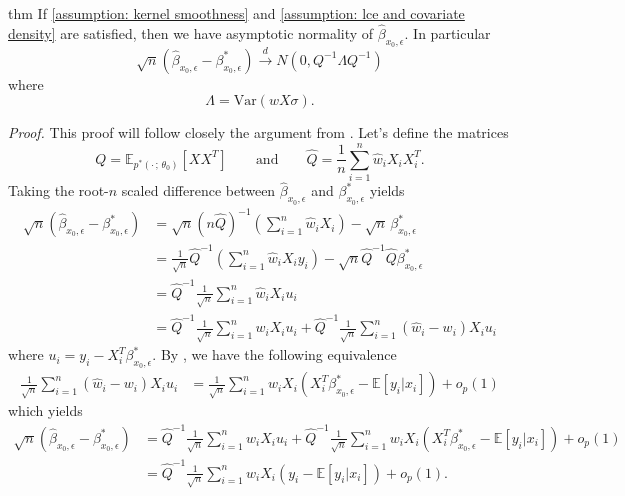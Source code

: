 \documentclass[11pt]{article}
\begin{document}
\begin{restatable}{thm}{} \label{thm: central limit for beta}
    If \cref{assumption: kernel smoothness} and \cref{assumption: lce and covariate density} are satisfied, then we have asymptotic normality of $\hat{\beta}_{x_0,\epsilon}$. In particular
    \[\sqrt{n}(\hat{\beta}_{x_0, \epsilon} - \beta^*_{x_0, \epsilon}) \overset{d}{\rightarrow} N(0, Q^{-1}\Lambda Q^{-1})\]
    where 
    \[\Lambda = \text{Var}(wX\sigma).\]
\end{restatable}
\noindent \textit{Proof.} This proof will follow closely the argument from \citet{Newey_Ruud_2005}. Let's define the matrices
\begin{equation}
    Q = \mathbb{E}_{p^*(\cdot\,;\, \theta_0)}\left[XX^T\right] \qquad \text{and} \qquad \hat{Q} = \frac{1}{n}\sum_{i = 1}^n\hat{w}_iX_iX_i^T.
\end{equation}
Taking the root-$n$ scaled difference between $\hat{\beta}_{x_0, \epsilon}$ and $\beta^*_{x_0, \epsilon}$ yields
\begin{align}
    \sqrt{n}(\hat{\beta}_{x_0, \epsilon} -\beta^*_{x_0, \epsilon}) &= \sqrt{n}\left(n\hat{Q}\right)^{-1}\left(\sum_{i = 1}^n\hat{w}_iX_i\right) - \sqrt{n}\,\beta_{x_0, \epsilon}^*\\
    &= \frac{1}{\sqrt{n}}\hat{Q}^{-1}\left(\sum_{i = 1}^n\hat{w}_iX_iy_i\right) - \sqrt{n}\hat{Q}^{-1}\hat{Q}\beta_{x_0, \epsilon}^* \\
    &= \hat{Q}^{-1}\frac{1}{\sqrt{n}}\sum_{i=1}^n \hat{w}_iX_iu_i\\
    &= \hat{Q}^{-1}\frac{1}{\sqrt{n}}\sum_{i = 1}^nw_iX_iu_i + \hat{Q}^{-1}\frac{1}{\sqrt{n}}\sum_{i = 1}^n(\hat{w}_i - w_i)X_iu_i\label{eq: asymptotic expansion}
\end{align}
where $u_i = y_i - X_i^T\beta^*_{x_0, \epsilon}$. By , we have the following equivalence
\begin{align}
    \frac{1}{\sqrt{n}}\sum_{i = 1}^n(\hat{w}_i - w_i)X_iu_i &= \frac{1}{\sqrt{n}}\sum_{i = 1}^nw_iX_i\left(X_i^T\beta^*_{x_0, \epsilon} - \mathbb{E}[y_i|x_i]\right) + o_p(1)
\end{align}
which yields
\begin{align}
    \sqrt{n}(\hat{\beta}_{x_0, \epsilon} -\beta^*_{x_0, \epsilon}) &= \hat{Q}^{-1}\frac{1}{\sqrt{n}}\sum_{i = 1}^nw_iX_iu_i + \hat{Q}^{-1}\frac{1}{\sqrt{n}}\sum_{i = 1}^nw_iX_i\left(X_i^T\beta^*_{x_0, \epsilon} - \mathbb{E}[y_i|x_i]\right) + o_p(1) \\
    &= \hat{Q}^{-1}\frac{1}{\sqrt{n}}\sum_{i = 1}^nw_iX_i\left(y_i - \mathbb{E}[y_i|x_i]\right) + o_p(1).
\end{align}
\end{document}
